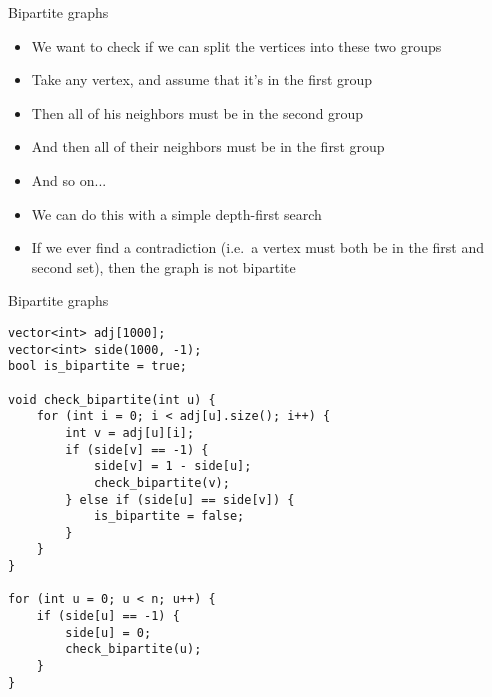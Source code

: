 \documentclass[10pt]{beamer}
\newcommand{\bi}{\begin{itemize}}
\newcommand{\ei}{\end{itemize}}
\begin{document}
\begin{frame}{Bipartite graphs}
    \bi
        \item We want to check if we can split the vertices into these two groups
        \item Take any vertex, and assume that it's in the first group
        \item Then all of his neighbors must be in the second group
        \item And then all of their neighbors must be in the first group
        \item And so on...
        \vspace{10pt}
        \item We can do this with a simple depth-first search
        \item If we ever find a contradiction (i.e.\ a vertex must both be in the first and second set), then the graph is not bipartite
    \ei
\end{frame}

\begin{frame}[fragile]{Bipartite graphs}
    \begin{verbatim}
vector<int> adj[1000];
vector<int> side(1000, -1);
bool is_bipartite = true;

void check_bipartite(int u) {
    for (int i = 0; i < adj[u].size(); i++) {
        int v = adj[u][i];
        if (side[v] == -1) {
            side[v] = 1 - side[u];
            check_bipartite(v);
        } else if (side[u] == side[v]) {
            is_bipartite = false;
        }
    }
}

for (int u = 0; u < n; u++) {
    if (side[u] == -1) {
        side[u] = 0;
        check_bipartite(u);
    }
}
    \end{verbatim}
\end{frame}
\end{document}
